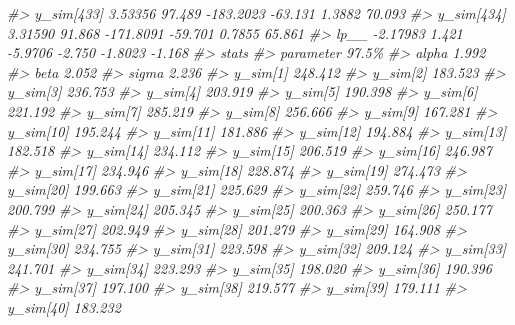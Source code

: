 \documentclass[
  10pt,
  italian,
  a4paper,
  extrafontsizes,onecolumn,openright
  ]{memoir}
\newenvironment{Shaded}{\begin{snugshade}}{\end{snugshade}}
\newcommand{\CommentTok}[1]{\textcolor[rgb]{0.56,0.35,0.01}{\textit{#1}}}
\begin{document}
\begin{Shaded}
\begin{Highlighting}[]
\CommentTok{\#\textgreater{}   y\_sim[433]  3.53356  97.489 {-}183.2023 {-}63.131  1.3882  70.093}
\CommentTok{\#\textgreater{}   y\_sim[434]  3.31590  91.868 {-}171.8091 {-}59.701  0.7855  65.861}
\CommentTok{\#\textgreater{}   lp\_\_       {-}2.17983   1.421   {-}5.9706  {-}2.750 {-}1.8023  {-}1.168}
\CommentTok{\#\textgreater{}             stats}
\CommentTok{\#\textgreater{} parameter      97.5\%}
\CommentTok{\#\textgreater{}   alpha        1.992}
\CommentTok{\#\textgreater{}   beta         2.052}
\CommentTok{\#\textgreater{}   sigma        2.236}
\CommentTok{\#\textgreater{}   y\_sim[1]   248.412}
\CommentTok{\#\textgreater{}   y\_sim[2]   183.523}
\CommentTok{\#\textgreater{}   y\_sim[3]   236.753}
\CommentTok{\#\textgreater{}   y\_sim[4]   203.919}
\CommentTok{\#\textgreater{}   y\_sim[5]   190.398}
\CommentTok{\#\textgreater{}   y\_sim[6]   221.192}
\CommentTok{\#\textgreater{}   y\_sim[7]   285.219}
\CommentTok{\#\textgreater{}   y\_sim[8]   256.666}
\CommentTok{\#\textgreater{}   y\_sim[9]   167.281}
\CommentTok{\#\textgreater{}   y\_sim[10]  195.244}
\CommentTok{\#\textgreater{}   y\_sim[11]  181.886}
\CommentTok{\#\textgreater{}   y\_sim[12]  194.884}
\CommentTok{\#\textgreater{}   y\_sim[13]  182.518}
\CommentTok{\#\textgreater{}   y\_sim[14]  234.112}
\CommentTok{\#\textgreater{}   y\_sim[15]  206.519}
\CommentTok{\#\textgreater{}   y\_sim[16]  246.987}
\CommentTok{\#\textgreater{}   y\_sim[17]  234.946}
\CommentTok{\#\textgreater{}   y\_sim[18]  228.874}
\CommentTok{\#\textgreater{}   y\_sim[19]  274.473}
\CommentTok{\#\textgreater{}   y\_sim[20]  199.663}
\CommentTok{\#\textgreater{}   y\_sim[21]  225.629}
\CommentTok{\#\textgreater{}   y\_sim[22]  259.746}
\CommentTok{\#\textgreater{}   y\_sim[23]  200.799}
\CommentTok{\#\textgreater{}   y\_sim[24]  205.345}
\CommentTok{\#\textgreater{}   y\_sim[25]  200.363}
\CommentTok{\#\textgreater{}   y\_sim[26]  250.177}
\CommentTok{\#\textgreater{}   y\_sim[27]  202.949}
\CommentTok{\#\textgreater{}   y\_sim[28]  201.279}
\CommentTok{\#\textgreater{}   y\_sim[29]  164.908}
\CommentTok{\#\textgreater{}   y\_sim[30]  234.755}
\CommentTok{\#\textgreater{}   y\_sim[31]  223.598}
\CommentTok{\#\textgreater{}   y\_sim[32]  209.124}
\CommentTok{\#\textgreater{}   y\_sim[33]  241.701}
\CommentTok{\#\textgreater{}   y\_sim[34]  223.293}
\CommentTok{\#\textgreater{}   y\_sim[35]  198.020}
\CommentTok{\#\textgreater{}   y\_sim[36]  190.396}
\CommentTok{\#\textgreater{}   y\_sim[37]  197.100}
\CommentTok{\#\textgreater{}   y\_sim[38]  219.577}
\CommentTok{\#\textgreater{}   y\_sim[39]  179.111}
\CommentTok{\#\textgreater{}   y\_sim[40]  183.232}

\end{Highlighting}
\end{Shaded}
\end{document}
